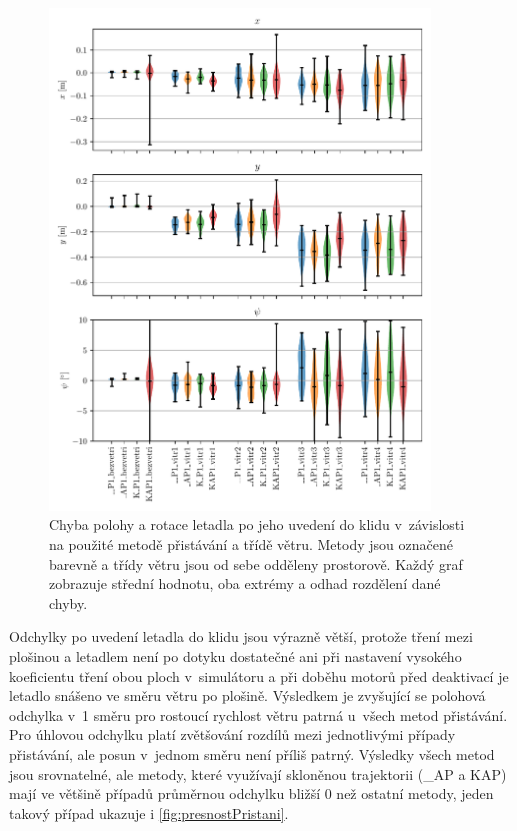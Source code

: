     \begin{figure}[H]
      \centering
      \includegraphics[width=0.9\textwidth]{img/results/presnostPristani.pdf}
      \caption[Chyba přistání]{Chyba polohy a rotace letadla po jeho uvedení do klidu v~závislosti na použité metodě přistávání a třídě větru. Metody jsou označené barevně a třídy větru jsou od sebe odděleny prostorově. Každý graf zobrazuje střední hodnotu, oba extrémy a odhad rozdělení dané chyby.}
      \label{fig:pristaniViolin}
    \end{figure}

    Odchylky po uvedení letadla do klidu jsou výrazně větší, protože tření mezi plošinou a letadlem není po dotyku dostatečné ani při nastavení vysokého koeficientu tření obou ploch v~simulátoru a při doběhu motorů před deaktivací je letadlo snášeno ve směru větru po plošině. Výsledkem je zvyšující se polohová odchylka v~1 směru pro rostoucí rychlost větru patrná u~všech metod přistávání. Pro úhlovou odchylku platí zvětšování rozdílů mezi jednotlivými případy přistávání, ale posun v~jednom směru není příliš patrný. Výsledky všech metod jsou srovnatelné, ale metody, které využívají skloněnou trajektorii (\_AP a KAP) mají ve většině případů průměrnou odchylku bližší 0 než ostatní metody, jeden takový případ ukazuje i \cref{fig:presnostPristani}.

